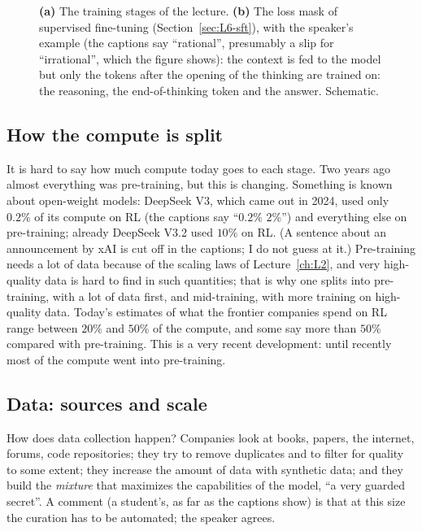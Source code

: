 \begin{figure}[tb]
\caption{\textbf{(a)} The training stages of the lecture. \textbf{(b)} The loss mask of supervised fine-tuning (Section~\ref{sec:L6-sft}), with the speaker's example (the captions say ``rational'', presumably a slip for ``irrational'', which the figure shows): the context is fed to the model but only the tokens after the opening of the thinking are trained on: the reasoning, the end-of-thinking token and the answer. Schematic.}
\label{fig:L6-stages}
\end{figure}

\subsection{How the compute is split}\label{sec:L6-compute}
It is hard to say how much compute today goes to each stage. Two years ago almost everything was pre-training, but this is changing. Something is known about open-weight models: DeepSeek V3, which came out in 2024, used only $0.2\%$ of its compute on RL (the captions say ``$0.2\%$ $2\%$''\flag) and everything else on pre-training; already DeepSeek V3.2 used $10\%$ on RL. (A sentence about an announcement by xAI is cut off in the captions; I do not guess at it.) Pre-training needs a lot of data because of the scaling laws of Lecture~\ref{ch:L2}, and very high-quality data is hard to find in such quantities; that is why one splits into pre-training, with a lot of data first, and mid-training, with more training on high-quality data. Today's estimates of what the frontier companies spend on RL range between $20\%$ and $50\%$ of the compute, and some say more than $50\%$ compared with pre-training. This is a very recent development: until recently most of the compute went into pre-training.

\subsection{Data: sources and scale}\label{sec:L6-data}
How does data collection happen? Companies look at books, papers, the internet, forums, code repositories; they try to remove duplicates and to filter for quality to some extent; they increase the amount of data with synthetic data; and they build the \emph{mixture} that maximizes the capabilities of the model, ``a very guarded secret''. A comment (a student's, as far as the captions show\flag) is that at this size the curation has to be automated; the speaker agrees.

